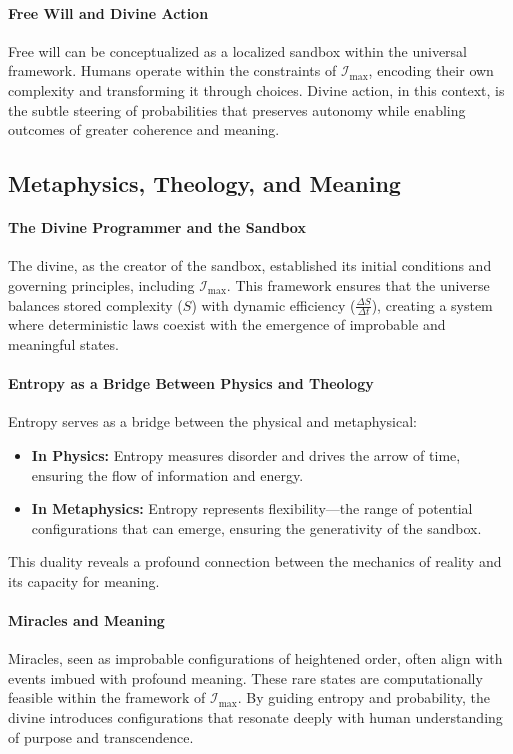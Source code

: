 \documentclass[12pt]{article}
\begin{document}
\paragraph{Free Will and Divine Action}
Free will can be conceptualized as a localized sandbox within the universal framework. Humans operate within the constraints of \(\mathcal{I}_{\text{max}}\), encoding their own complexity and transforming it through choices. Divine action, in this context, is the subtle steering of probabilities that preserves autonomy while enabling outcomes of greater coherence and meaning.

\subsection{Metaphysics, Theology, and Meaning}

\paragraph{The Divine Programmer and the Sandbox}
The divine, as the creator of the sandbox, established its initial conditions and governing principles, including \(\mathcal{I}_{\text{max}}\). This framework ensures that the universe balances stored complexity (\(S\)) with dynamic efficiency (\(\frac{\Delta S}{\Delta t}\)), creating a system where deterministic laws coexist with the emergence of improbable and meaningful states.

\paragraph{Entropy as a Bridge Between Physics and Theology}
Entropy serves as a bridge between the physical and metaphysical:
\begin{itemize}
    \item \textbf{In Physics:} Entropy measures disorder and drives the arrow of time, ensuring the flow of information and energy.
    \item \textbf{In Metaphysics:} Entropy represents flexibility—the range of potential configurations that can emerge, ensuring the generativity of the sandbox.
\end{itemize}
This duality reveals a profound connection between the mechanics of reality and its capacity for meaning.

\paragraph{Miracles and Meaning}
Miracles, seen as improbable configurations of heightened order, often align with events imbued with profound meaning. These rare states are computationally feasible within the framework of \(\mathcal{I}_{\text{max}}\). By guiding entropy and probability, the divine introduces configurations that resonate deeply with human understanding of purpose and transcendence.
\end{document}
